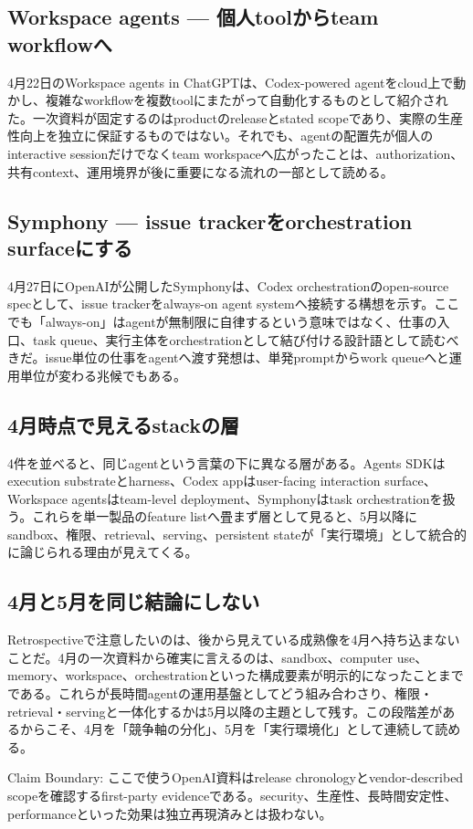 \subsection{Workspace agents — 個人toolからteam workflowへ}

4月22日のWorkspace agents in ChatGPTは、Codex-powered agentをcloud上で動かし、複雑なworkflowを複数toolにまたがって自動化するものとして紹介された。一次資料が固定するのはproductのreleaseとstated scopeであり、実際の生産性向上を独立に保証するものではない。それでも、agentの配置先が個人のinteractive sessionだけでなくteam workspaceへ広がったことは、authorization、共有context、運用境界が後に重要になる流れの一部として読める。\autocite{src-c71ef79e3212}


\subsection{Symphony — issue trackerをorchestration surfaceにする}

4月27日にOpenAIが公開したSymphonyは、Codex orchestrationのopen-source specとして、issue trackerをalways-on agent systemへ接続する構想を示す。ここでも「always-on」はagentが無制限に自律するという意味ではなく、仕事の入口、task queue、実行主体をorchestrationとして結び付ける設計語として読むべきだ。issue単位の仕事をagentへ渡す発想は、単発promptからwork queueへと運用単位が変わる兆候でもある。\autocite{src-f9ff221789e0}


\subsection{4月時点で見えるstackの層}

4件を並べると、同じagentという言葉の下に異なる層がある。Agents SDKはexecution substrateとharness、Codex appはuser-facing interaction surface、Workspace agentsはteam-level deployment、Symphonyはtask orchestrationを扱う。これらを単一製品のfeature listへ畳まず層として見ると、5月以降にsandbox、権限、retrieval、serving、persistent stateが「実行環境」として統合的に論じられる理由が見えてくる。\autocite{src-1ecdad90bfb4,src-20e34cbfb714,src-c71ef79e3212,src-f9ff221789e0}


\subsection{4月と5月を同じ結論にしない}

Retrospectiveで注意したいのは、後から見えている成熟像を4月へ持ち込まないことだ。4月の一次資料から確実に言えるのは、sandbox、computer use、memory、workspace、orchestrationといった構成要素が明示的になったことまでである。これらが長時間agentの運用基盤としてどう組み合わさり、権限・retrieval・servingと一体化するかは5月以降の主題として残す。この段階差があるからこそ、4月を「競争軸の分化」、5月を「実行環境化」として連続して読める。\autocite{src-1ecdad90bfb4,src-20e34cbfb714,src-c71ef79e3212,src-f9ff221789e0}


\begin{claimboundary}
Claim Boundary: ここで使うOpenAI資料はrelease chronologyとvendor-described scopeを確認するfirst-party evidenceである。security、生産性、長時間安定性、performanceといった効果は独立再現済みとは扱わない。\autocite{src-1ecdad90bfb4,src-20e34cbfb714,src-c71ef79e3212,src-f9ff221789e0}
\end{claimboundary}
